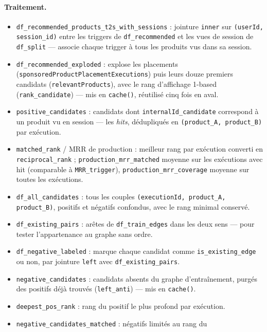 \documentclass[11pt,a4paper]{article}
\newcommand{\code}[1]{\texttt{\small #1}}
\begin{document}
\paragraph{Traitement.}
\begin{itemize}[nosep,leftmargin=*]
  \item \code{df\_recommended\_products\_t2s\_with\_sessions} : jointure
        \code{inner} sur \code{(userId, session\_id)} entre les triggers de
        \code{df\_recommended} et les vues de session de \code{df\_split} ---
        associe chaque trigger à tous les produits vus dans sa session.
  \item \code{df\_recommended\_exploded} : explose les placements
        (\code{sponsoredProductPlacementExecutions}) puis leurs douze premiers
        candidats (\code{relevantProducts}), avec le rang d'affichage 1-based
        (\code{rank\_candidate}) --- mis en \code{cache()}, réutilisé cinq fois
        en aval.
  \item \code{positive\_candidates} : candidats dont
        \code{internalId\_candidate} correspond à un produit vu en session ---
        les \emph{hits}, dédupliqués en \code{(product\_A, product\_B)} par
        exécution.
  \item \code{matched\_rank} / MRR de production : meilleur rang par
        exécution converti en \code{reciprocal\_rank} ;
        \code{production\_mrr\_matched} moyenne sur les exécutions avec hit
        (comparable à \code{MRR\_trigger}), \code{production\_mrr\_coverage}
        moyenne sur toutes les exécutions.
  \item \code{df\_all\_candidates} : tous les couples
        \code{(executionId, product\_A, product\_B)}, positifs et négatifs
        confondus, avec le rang minimal conservé.
  \item \code{df\_existing\_pairs} : arêtes de \code{df\_train\_edges} dans
        les deux sens --- pour tester l'appartenance au graphe sans ordre.
  \item \code{df\_negative\_labeled} : marque chaque candidat comme
        \code{is\_existing\_edge} ou non, par jointure \code{left} avec
        \code{df\_existing\_pairs}.
  \item \code{negative\_candidates} : candidats absents du graphe
        d'entraînement, purgés des positifs déjà trouvés (\code{left\_anti})
        --- mis en \code{cache()}.
  \item \code{deepest\_pos\_rank} : rang du positif le plus profond par
        exécution.
  \item \code{negative\_candidates\_matched} : négatifs limités au rang du

\end{itemize}
\end{document}
